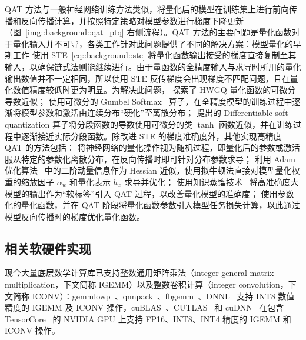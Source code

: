 QAT 方法与一般神经网络训练方法类似，将量化后的模型在训练集上进行前向传播和反向传播计算，并按照特定策略对模型参数进行梯度下降更新（图~\ref{img::background::qat_ptq} 右侧流程）。QAT 方法的主要问题是量化函数对于量化输入并不可导，各类工作针对此问题提供了不同的解决方案：模型量化的早期工作 \citet{courbariaux2015binaryconnect, hubara2016binarized, rastegari2016xnor, zhou2016dorefanet} 使用 STE~\eqref{eq::background::ste} 将量化函数输出接受的梯度直接复制至其输入，以确保链式法则能继续进行。由于量函数的全精度输入与求导时所用的量化输出数值并不一定相同，所以使用 STE 反传梯度会出现梯度不匹配问题，且在量化数值精度较低时更为明显。为解决此问题，\citet{cai2017deep} 探索了 HWGQ 量化函数的可微分导数近似；\citet{louizos2018relaxed} 使用可微分的 Gumbel Softmax~\citep{jang2016categorical, maddison2016concrete} 算子，在全精度模型的训练过程中逐渐将模型参数和激活由连续分布“硬化”至离散分布；\citet{gong2019differentiable} 提出的 Differentiable soft quantization 算子将分段函数的导数使用可微分的类 $\tanh$ 函数近似，并在训练过程中逐渐接近实际分段函数。除改进 STE 的梯度准确度外，其他实现高精度 QAT 的方法包括：\citet{peters2018probabilistic, shayer2018learning} 将神经网络的量化操作视为随机过程，即量化后的参数或激活服从特定的参数化离散分布，在反向传播时即可针对分布参数求导；\citet{hou2016loss, hou2018loss} 利用 Adam 优化算法~\citep{kingma2014adam} 中的二阶动量信息作为 Hessian 近似，使用拟牛顿法直接对模型量化权重的缩放因子 $\alpha_w$ 和量化表示 $b_w$ 求导并优化；\citet{polino2018model, mishra2018apprentice} 使用知识蒸馏技术~\citep{hinton2015distilling} 将高准确度大模型的输出作为“软标签”引入 QAT 过程，以改善量化模型的准确度；\citet{jung2019learning} 使用参数化的量化函数，并在 QAT 阶段将量化函数参数引入模型任务损失计算，以此通过模型反向传播时的梯度优化量化函数。
\subsection{相关软硬件实现}
现今大量底层数学计算库已支持整数通用矩阵乘法（integer general matrix multiplication，下文简称 IGEMM）以及整数卷积计算（integer convolution，下文简称 ICONV）：gemmlowp~\citep{google2018gemmlowp}、qnnpack~\citep{facebook2018qnnpack}、fbgemm~\citep{facebook2018fbgemm}、DNNL~\citep{intel2019dnnl} 支持 INT8 数值精度的 IGEMM 及 ICONV 操作，cuBLAS~\citep{nvidia2008cublas}、CUTLAS~\citep{nvidia2019cutlass} 和 cuDNN~\citep{chetlur2014cudnn} 在包含 TensorCore~\citep{nvidia2018turing} 的 NVIDIA GPU 上支持 FP16、INT8、INT4 精度的 IGEMM 和 ICONV 操作。

